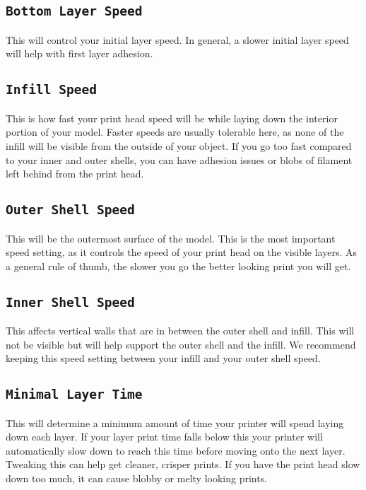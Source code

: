 \subsection{\texttt{Bottom Layer Speed}}
This will control your initial layer speed. In general, a slower initial layer speed will help with first layer adhesion. 

\subsection{\texttt{Infill Speed}}
This is how fast your print head speed will be while laying down the interior portion of your model. Faster speeds are usually tolerable here, as none of the infill will be visible from the outside of your object. If you go too fast compared to your inner and outer shells, you can have adhesion issues or blobs of filament left behind from the print head.

\subsection{\texttt{Outer Shell Speed}}
This will be the outermost surface of the model. This is the most important speed setting, as it controls the speed of your print head on the visible layers. As a general rule of thumb, the slower you go the better looking print you will get. 

\subsection{\texttt{Inner Shell Speed}}
This affects vertical walls that are in between the outer shell and infill. This will not be visible but will help support the outer shell and the infill. We recommend keeping this speed setting between your infill and your outer shell speed.

\subsection{\texttt{Minimal Layer Time}}
This will determine a minimum amount of time your printer will spend laying down each layer. If your layer print time falls below this your printer will automatically slow down to reach this time before moving onto the next layer. Tweaking this can help get cleaner, crisper prints. If you have the print head slow down too much, it can cause blobby or melty looking prints.

